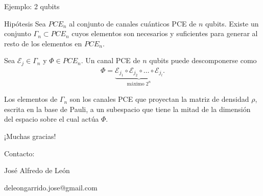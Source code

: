 \documentclass[xcolor=dvipsnames,presentation]{beamer}%
\begin{document}
\begin{frame}{Ejemplo: 2 qubits}
\end{frame}

\begin{frame}{Hipótesis}
Sea $PCE_n$ al conjunto de canales cuánticos PCE de $n$
qubits. Existe un conjunto $\Gamma_n\subset PCE_n$ cuyos
elementos son necesarios y suficientes para generar al resto
de los elementos en $PCE_n$. \vfill \pause

Sea $\mathcal{E}_j\in \Gamma_n$ y $\Phi \in PCE_n$. Un canal 
PCE de $n$ qubits puede descomponerse como
\begin{align*}
\Phi = \underbrace{\mathcal{E}_{j_1}\circ \mathcal{E}_{j_2}\circ \ldots
\circ \mathcal{E}_{j_l}}_{\text{máximo }2^n}.
\end{align*}\vfill \pause

Los elementos de $\Gamma_n$ son los canales PCE
que proyectan la matriz de densidad $\rho$, escrita en la base de Pauli,
a un subespacio que tiene la mitad de la dimensión del espacio sobre 
el cual actúa $\Phi$.
\end{frame}

\begin{frame}
  \begin{center}
    ¡Muchas gracias!

    \vfill

    Contacto:

    José Alfredo de León

    deleongarrido.jose@gmail.com
  \end{center}
\end{frame}
\end{document}
